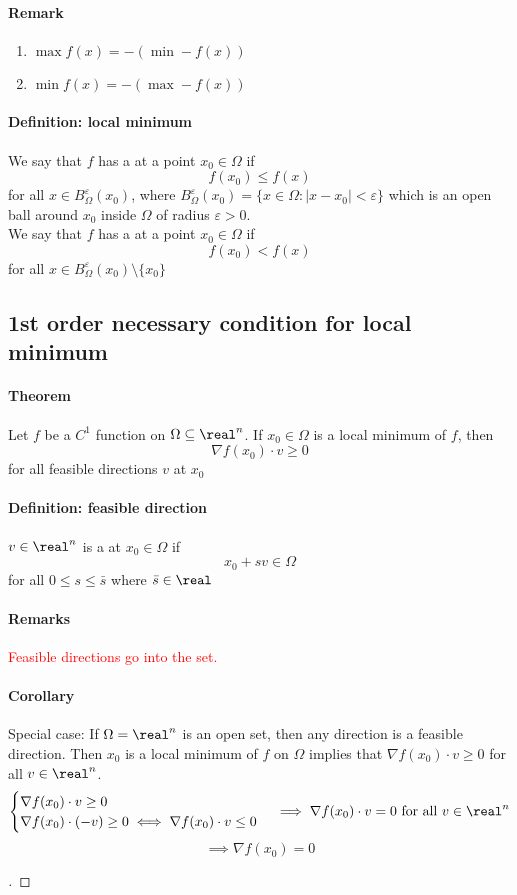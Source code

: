 \documentclass[11pt]{article}
\begin{document}
\paragraph{Remark}
\begin{enumerate}
	\item $\max f(x) = - (\min - f(x))$
	\item $\min f(x) = - (\max - f(x))$
\end{enumerate}

\paragraph{Definition: local minimum}
We say that $f$ has a  at a point $x_0 \in \Omega$ if
$$f(x_0) \leq f(x)$$ for all $x \in B_{\Omega}^\varepsilon (x_0)$, where $B_{\Omega}^\varepsilon (x_0) = \{ x \in \Omega: |x - x_0| < \varepsilon\}$ which is an open ball around $x_0$ inside $\Omega$ of radius $\varepsilon >0$. \\
We say that $f$ has a  at a point $x_0 \in \Omega$ if
$$f(x_0) < f(x)$$ for all $x \in B_{\Omega}^\varepsilon (x_0) \setminus \{x_0\}$

\subsection{1st order necessary condition for local minimum}
\paragraph{Theorem} Let $f$ be a $C^1$ function on $\Omega \subseteq \real^n$. If $x_0 \in \Omega$ is a local minimum of $f$, then
$$ \nabla f(x_0) \cdot v \geq 0$$
for all feasible directions $v$ at $x_0$

\paragraph{Definition: feasible direction}
$v \in \real^n$ is a  at $x_0 \in \Omega$ if $$x_0 + sv \in \Omega$$ for all $0 \leq s \leq \bar{s}$ where $\bar{s} \in \real$
\paragraph{Remarks}
\textcolor{red}{Feasible directions go into the set.}
\paragraph{Corollary}
Special case: If $\Omega = \real^n$ is an open set, then any direction is a feasible direction.
Then $x_0$ is a local minimum of $f$ on $\Omega$ implies that $\nabla f(x_0) \cdot v \geq 0$ for all $v \in \real^n$.
$$\begin{cases}
	\nabla f(x_0) \cdot v \geq 0 \\
	\nabla f(x_0) \cdot (-v) \geq 0 \iff \nabla f(x_0) \cdot v \leq 0
\end{cases} \implies \nabla f(x_0) \cdot v = 0 \text{ for all $v \in \real^n$}$$
$$\implies \nabla f(x_0) = 0$$
\begin{proof}
[ ]
\end{proof}
\end{document}
